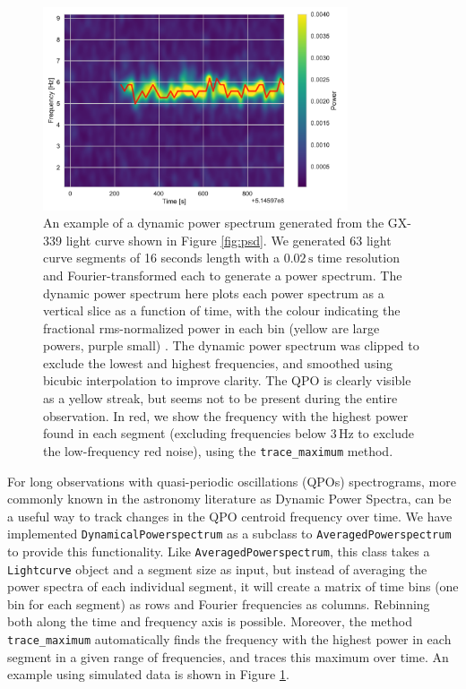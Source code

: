 \documentclass[twocolumn]{aastex62}
\newcommand{\lightcurve}{\texttt{Lightcurve}\xspace}
\begin{document}
\begin{figure}[htbp]
\begin{center}
\includegraphics[width=9cm]{../figures/dyn_spec.pdf}
\caption{An example of a dynamic power spectrum generated from the GX-339 light curve shown in Figure \ref{fig:psd}. We generated 63 light curve segments of 16 seconds length with a $0.02\,\mathrm{s}$ time resolution and Fourier-transformed each to generate a power spectrum. The dynamic power spectrum here plots each power spectrum as a vertical slice as a function of time, with the colour indicating the fractional rms-normalized power in each bin (yellow are large powers, purple small) . The dynamic power spectrum was clipped to exclude the lowest and highest frequencies, and smoothed using bicubic interpolation to improve clarity. The QPO is clearly visible as a yellow streak, but seems not to be present during the entire observation. In red, we show the frequency with the highest power found in each segment (excluding frequencies below $3\,\mathrm{Hz}$ to exclude the low-frequency red noise), using the \texttt{trace\_maximum} method.}
\label{fig:dynspec}
\end{center}
\end{figure}

For long observations with quasi-periodic oscillations (QPOs) spectrograms, more commonly known in the astronomy literature as Dynamic Power Spectra, can be a useful way to track changes in the QPO centroid frequency over time. We have implemented \texttt{DynamicalPowerspectrum} as a subclass to \texttt{AveragedPowerspectrum} to provide this functionality. Like \texttt{AveragedPowerspectrum}, this class takes a \lightcurve object and a segment size as input, but instead of averaging the power spectra of each individual segment, it will create a matrix of time bins (one bin for each segment) as rows and Fourier frequencies as columns. Rebinning both along the time and frequency axis is possible. Moreover, the method \texttt{trace\_maximum} automatically finds the frequency with the highest power in each segment in a given range of frequencies, and traces this maximum over time. An example using simulated data is shown in Figure \ref{fig:dynspec}.
\end{document}
